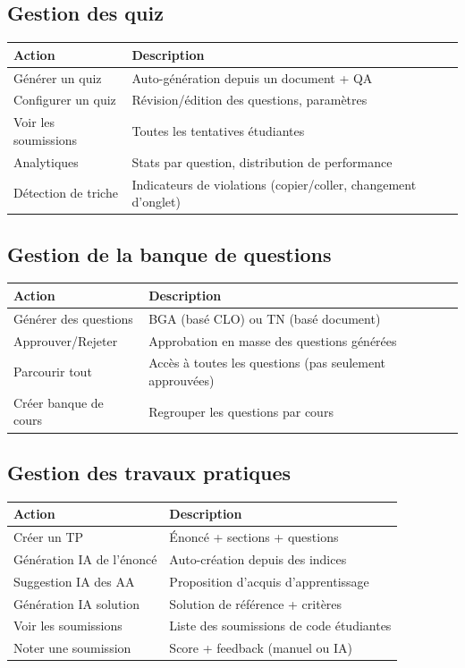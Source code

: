 \documentclass[12pt,a4paper]{article}
\begin{document}
\subsection{Gestion des quiz}

\begin{longtable}{@{}p{4.5cm}p{10cm}@{}}
\toprule
\textbf{Action} & \textbf{Description} \\
\midrule
\endhead
Générer un quiz & Auto-génération depuis un document + QA \\
Configurer un quiz & Révision/édition des questions, paramètres \\
Voir les soumissions & Toutes les tentatives étudiantes \\
Analytiques & Stats par question, distribution de performance \\
Détection de triche & Indicateurs de violations (copier/coller, changement d'onglet) \\
\bottomrule
\end{longtable}

\subsection{Gestion de la banque de questions}

\begin{longtable}{@{}p{4.5cm}p{10cm}@{}}
\toprule
\textbf{Action} & \textbf{Description} \\
\midrule
\endhead
Générer des questions & BGA (basé CLO) ou TN (basé document) \\
Approuver/Rejeter & Approbation en masse des questions générées \\
Parcourir tout & Accès à toutes les questions (pas seulement approuvées) \\
Créer banque de cours & Regrouper les questions par cours \\
\bottomrule
\end{longtable}

\subsection{Gestion des travaux pratiques}

\begin{longtable}{@{}p{5cm}p{9.5cm}@{}}
\toprule
\textbf{Action} & \textbf{Description} \\
\midrule
\endhead
Créer un TP & Énoncé + sections + questions \\
Génération IA de l'énoncé & Auto-création depuis des indices \\
Suggestion IA des AA & Proposition d'acquis d'apprentissage \\
Génération IA solution & Solution de référence + critères \\
Voir les soumissions & Liste des soumissions de code étudiantes \\
Noter une soumission & Score + feedback (manuel ou IA) \\
\bottomrule
\end{longtable}
\end{document}
